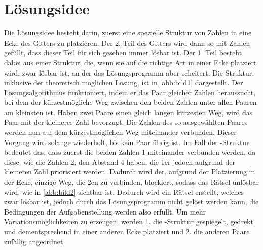 \section{Lösungsidee}
\begin{flushleft}
    Die Lösungsidee besteht darin, zuerst eine spezielle Struktur von Zahlen in eine Ecke des Gitters zu platzieren. Der 2. Teil des Gitters wird dann so mit Zahlen gefüllt, dass dieser Teil für sich gesehen immer lösbar ist.
    \linebreak
    \linebreak
    Der 1. Teil besteht dabei aus einer Struktur, die, wenn sie auf die richtige Art in einer Ecke platziert wird, zwar lösbar ist, an der das Lösungsprogramm aber scheitert.
    \linebreak
    \linebreak
    Die Struktur, inklusive der theoretisch möglichen Lösung, ist in \cref{abb:bild1} dargestellt.
    \linebreak
    \linebreak
    Der Lösungsalgorithmus funktioniert, indem er das Paar gleicher Zahlen heraussucht, bei dem der kürzestmögliche Weg zwischen den beiden Zahlen unter allen Paaren am kleinsten ist. Haben zwei Paare einen gleich langen kürzesten Weg, wird das Paar mit der kleineres Zahl bevorzugt. Die Zahlen des so ausgewählten Paares werden nun auf dem kürzestmöglichen Weg miteinander verbunden. Dieser Vorgang wird solange wiederholt, bis kein Paar übrig ist.
    \linebreak
    \linebreak
    Im Fall der \grqq-Struktur bedeutet das, dass zuerst die beiden Zahlen 1 miteinander verbunden werden, da diese, wie die Zahlen 2, den Abstand 4 haben, die 1er jedoch aufgrund der kleineren Zahl priorisiert werden. Dadurch wird der, aufgrund der Platzierung in der Ecke, einzige Weg, die 2en zu verbinden, blockiert, sodass das Rätsel unlösbar wird, wie in \cref{abb:bild2} sichtbar ist.
    \linebreak
    \linebreak
    Dadurch wird ein Rätsel erstellt, welches zwar lösbar ist, jedoch durch das Lösungsprogramm nicht gelöst werden kann, die Bedingungen der Aufgabenstellung werden also erfüllt.
    \linebreak
    \linebreak
    Um mehr Variationsmöglichkeiten zu erzeugen, werden 1. die \grqq-Struktur gespiegelt, gedrekt und dementsprechend in einer anderen Ecke platziert und 2. die anderen Paare zufällig angeordnet.
\end{flushleft}

